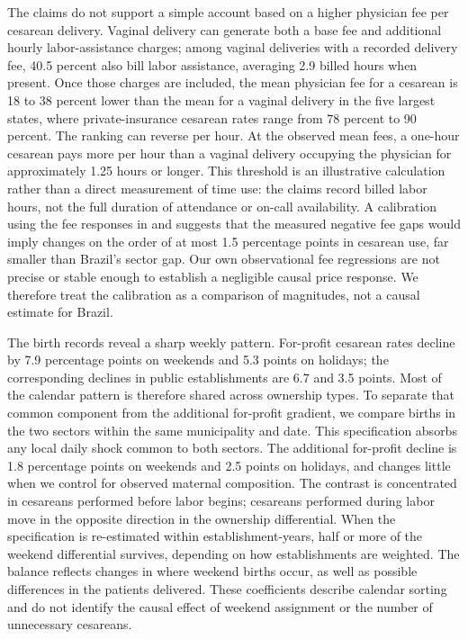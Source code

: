 \documentclass[12pt]{article}
\begin{document}
The claims do not support a simple account based on a higher physician fee per cesarean delivery. Vaginal delivery can generate both a base fee and additional hourly labor-assistance charges; among vaginal deliveries with a recorded delivery fee, 40.5 percent also bill labor assistance, averaging 2.9 billed hours when present. Once those charges are included, the mean physician fee for a cesarean is 18 to 38 percent lower than the mean for a vaginal delivery in the five largest states, where private-insurance cesarean rates range from 78 percent to 90 percent. The ranking can reverse per hour. At the observed mean fees, a one-hour cesarean pays more per hour than a vaginal delivery occupying the physician for approximately 1.25 hours or longer. This threshold is an illustrative calculation rather than a direct measurement of time use: the claims record billed labor hours, not the full duration of attendance or on-call availability. A calibration using the fee responses in \citet{gruber1999physician} and \citet{grant2009} suggests that the measured negative fee gaps would imply changes on the order of at most 1.5 percentage points in cesarean use, far smaller than Brazil's sector gap. Our own observational fee regressions are not precise or stable enough to establish a negligible causal price response. We therefore treat the calibration as a comparison of magnitudes, not a causal estimate for Brazil.

The birth records reveal a sharp weekly pattern. For-profit cesarean rates decline by 7.9 percentage points on weekends and 5.3 points on holidays; the corresponding declines in public establishments are 6.7 and 3.5 points. Most of the calendar pattern is therefore shared across ownership types. To separate that common component from the additional for-profit gradient, we compare births in the two sectors within the same municipality and date. This specification absorbs any local daily shock common to both sectors. The additional for-profit decline is 1.8 percentage points on weekends and 2.5 points on holidays, and changes little when we control for observed maternal composition. The contrast is concentrated in cesareans performed before labor begins; cesareans performed during labor move in the opposite direction in the ownership differential. When the specification is re-estimated within establishment-years, half or more of the weekend differential survives, depending on how establishments are weighted. The balance reflects changes in where weekend births occur, as well as possible differences in the patients delivered. These coefficients describe calendar sorting and do not identify the causal effect of weekend assignment or the number of unnecessary cesareans.
\end{document}
